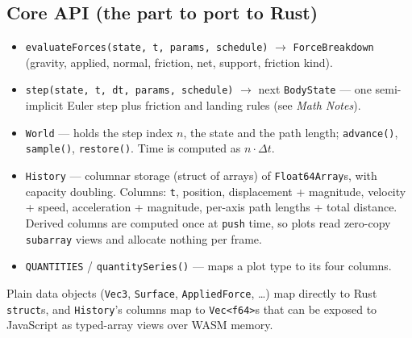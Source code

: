 \documentclass[11pt]{article}
\begin{document}
\subsection{Core API (the part to port to Rust)}
\begin{itemize}
  \item \texttt{evaluateForces(state, t, params, schedule)} $\to$ \texttt{ForceBreakdown}
        (gravity, applied, normal, friction, net, support, friction kind).
  \item \texttt{step(state, t, dt, params, schedule)} $\to$ next \texttt{BodyState} --- one
        semi-implicit Euler step plus friction and landing rules (see \emph{Math Notes}).
  \item \texttt{World} --- holds the step index $n$, the state and the path length; \texttt{advance()},
        \texttt{sample()}, \texttt{restore()}. Time is computed as $n\cdot\Delta t$.
  \item \texttt{History} --- columnar storage (struct of arrays) of \texttt{Float64Array}s, with
        capacity doubling. Columns: \texttt{t}, position, displacement + magnitude, velocity + speed,
        acceleration + magnitude, per-axis path lengths + total distance. Derived columns are
        computed once at \texttt{push} time, so plots read zero-copy \texttt{subarray} views and
        allocate nothing per frame.
  \item \texttt{QUANTITIES} / \texttt{quantitySeries()} --- maps a plot type to its four columns.
\end{itemize}
Plain data objects (\texttt{Vec3}, \texttt{Surface}, \texttt{AppliedForce}, \ldots) map directly to Rust
\texttt{struct}s, and \texttt{History}'s columns map to \texttt{Vec<f64>}s that can be exposed to
JavaScript as typed-array views over WASM memory.
\end{document}
